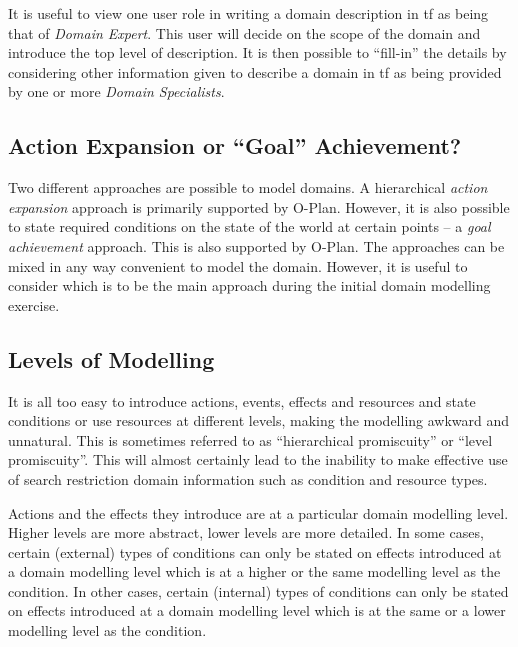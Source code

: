 It is useful to view one user role in writing a domain description in {\sc tf}
as being that of {\em Domain Expert}.  This user will decide on the scope of
the domain and introduce the top level of description.  It is then possible to
``fill-in'' the details by considering other information given to describe a
domain in {\sc tf} as being provided by one or more {\em Domain Specialists}.

\subsection{Action Expansion or ``Goal'' Achievement?}

Two different approaches are possible to model domains.  A hierarchical {\em
action expansion} approach is primarily supported by O-Plan.  However, it is
also possible to state required conditions on the state of the world at
certain points -- a {\em goal achievement} approach.  This is also supported by
O-Plan.  The approaches can be mixed in any way convenient to model the
domain.  However, it is useful to consider which is to be the main approach
during the initial domain modelling exercise.

\subsection{Levels of Modelling}

It is all too easy to introduce actions, events, effects and resources and
state conditions or use resources at different levels, making the modelling
awkward and unnatural.  This is sometimes referred to as ``hierarchical
promiscuity'' or ``level promiscuity''.  This will almost certainly lead to
the inability to make effective use of search restriction domain information
such as condition and resource types.

Actions and the effects they introduce are at a particular domain modelling
level.  Higher levels are more abstract, lower levels are more detailed.  In
some cases, certain (external) types of conditions can only be stated on
effects introduced at a domain modelling level which is at a higher or the
same modelling level as the condition.  In other cases, certain (internal)
types of conditions can only be stated on effects introduced at a domain
modelling level which is at the same or a lower modelling level as the
condition.

